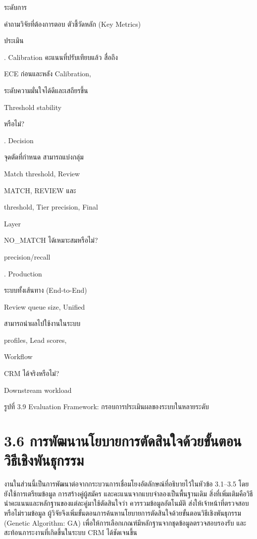 \documentclass[12pt,a4paper]{report}
\begin{document}
ระดับการ\par
คำถามวิจัยที่ต้องการตอบ ตัวชี้วัดหลัก (Key Metrics)\par
ประเมิน\par
{}. Calibration คะแนนที่ปรับเทียบแล้ว สื่อถึง\par
ECE ก่อนและหลัง Calibration,\par
ระดับความมั่นใจได้ดีและเสถียรขึ้น\par
Threshold stability\par
หรือไม่?\par
{}. Decision\par
จุดตัดที่กำหนด สามารถแบ่งกลุ่ม\par
Match threshold, Review\par
MATCH, REVIEW และ\par
threshold, Tier precision, Final\par
Layer\par
NO\_MATCH ได้เหมาะสมหรือไม่?\par
precision/recall\par
{}. Production\par
ระบบทั้งเส้นทาง (End-to-End)\par
Review queue size, Unified\par
สามารถนำผลไปใช้งานในระบบ\par
profiles, Lead scores,\par
Workflow\par
CRM ได้จริงหรือไม่?\par
Downstream workload\par
\clearpage
\begin{center}\small รูปที่ 3.9 Evaluation Framework: กรอบการประเมินผลของระบบในหลายระดับ\end{center}
\clearpage
\section*{3.6 การพัฒนานโยบายการตัดสินใจด้วยขั้นตอนวิธีเชิงพันธุกรรม}
งานในส่วนนี้เป็นการพัฒนาต่อจากกระบวนการเชื่อมโยงอัตลักษณ์ที่อธิบายไว้ในหัวข้อ 3.1--3.5 โดยยังใช้การเตรียมข้อมูล การสร้างคู่ผู้สมัคร และคะแนนจากแบบจำลองเป็นพื้นฐานเดิม สิ่งที่เพิ่มเติมคือวิธีนำคะแนนและหลักฐานของแต่ละคู่มาใช้ตัดสินใจว่า ควรรวมข้อมูลอัตโนมัติ ส่งให้เจ้าหน้าที่ตรวจสอบ หรือไม่รวมข้อมูล ผู้วิจัยจึงเพิ่มขั้นตอนการค้นหานโยบายการตัดสินใจด้วยขั้นตอนวิธีเชิงพันธุกรรม (Genetic Algorithm: GA) เพื่อให้การเลือกเกณฑ์มีหลักฐานจากชุดข้อมูลตรวจสอบรองรับ และสะท้อนภาระงานที่เกิดขึ้นในระบบ CRM ได้ชัดเจนขึ้น
\end{document}
